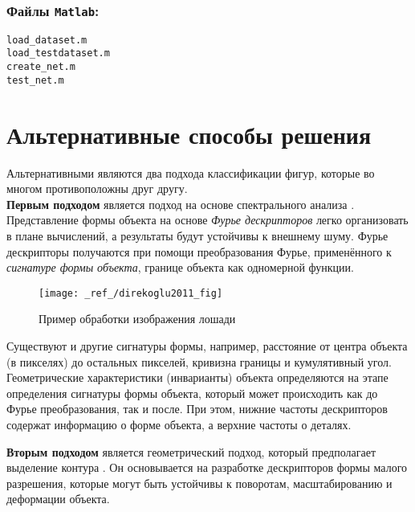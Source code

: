 \documentclass[12pt,a4paper]{article}
\begin{document}
\subsubsection*{Файлы \texttt{Matlab}:}
\verb|load_dataset.m |\\
\verb|load_testdataset.m |\\
\verb|create_net.m|\\
\verb|test_net.m|\\[6pt]





\newpage
\section{Альтернативные способы решения}
Альтернативными являются два подхода классификации фигур, которые во многом противоположны друг другу.\\
\noindent
\textbf{Первым подходом} является подход на основе спектрального анализа \cite{direkoglu2011}. 
Представление формы объекта на основе \emph{Фурье дескрипторов} легко организовать в плане вычислений,
а результаты будут устойчивы к внешнему шуму. Фурье дескрипторы получаются при помощи преобразования
Фурье, применённого к \emph{сигнатуре формы объекта}, границе объекта как одномерной функции.


\begin{figure}[tbh!]
	\center
	\texttt{[image: \_ref\_/direkoglu2011\_fig]}
	\caption{Пример обработки изображения лошади \cite{direkoglu2011}}
\end{figure}
Существуют и другие сигнатуры формы, например, расстояние от центра объекта (в пикселях) до остальных пикселей,
кривизна границы и кумулятивный угол. Геометрические характеристики (инварианты) объекта
определяются на этапе определения сигнатуры формы объекта, который может происходить как до
Фурье преобразования, так и после. При этом, нижние частоты дескрипторов содержат
информацию о форме объекта, а верхние частоты о деталях.

\noindent
\textbf{Вторым подходом} является геометрический подход, который предполагает выделение контура \cite{wang2014}. 
Он основывается на разработке дескрипторов формы малого разрешения, которые могут быть
устойчивы к поворотам, масштабированию и деформации объекта.
\end{document}
